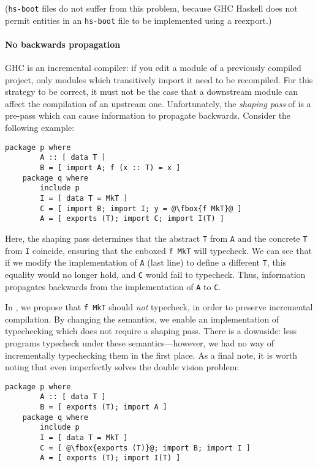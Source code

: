 (\verb|hs-boot| files do not suffer from this problem, because GHC
Haskell does not permit entities in an \verb|hs-boot| file to be implemented
using a reexport.)

\paragraph{No backwards propagation}
GHC is an incremental compiler: if you edit a module of a previously
compiled project, only modules which transitively import it need to be
recompiled.  For this strategy to be correct, it must not be the case
that a downstream module can affect the compilation of an upstream one.
Unfortunately, the \emph{shaping pass} of \OldBackpack{} is a pre-pass
which can cause information to propagate backwards.  Consider the
following example:

\begin{lstlisting}[escapechar=@]
    package p where
        A :: [ data T ]
        B = [ import A; f (x :: T) = x ]
    package q where
        include p
        I = [ data T = MkT ]
        C = [ import B; import I; y = @\fbox{f MkT}@ ]
        A = [ exports (T); import C; import I(T) ]
\end{lstlisting}
%
Here, the shaping pass determines that the abstract \verb|T| from
\verb|A| and the concrete \verb|T| from \verb|I| coincide, ensuring that
the enboxed \verb|f MkT| will typecheck.  We can see that if we
modify the implementation of \verb|A| (last line) to define a different
\verb|T|, this equality would no longer hold, and \verb|C| would
fail to typecheck.  Thus, information propagates backwards from
the implementation of \verb|A| to \verb|C|.

In \Backpack{}, we propose that \verb|f MkT| should \emph{not}
typecheck, in order to preserve incremental compilation.  By changing
the semantics, we enable an implementation of typechecking which
does not require a shaping pass.  There is a downside: less programs
typecheck under these semantics---however, we had no way of incrementally
typechecking them in the first place.  As a final note, it is worth
noting that even \OldBackpack{} imperfectly solves the double vision
problem:

\begin{lstlisting}[escapechar=@]
    package p where
        A :: [ data T ]
        B = [ exports (T); import A ]
    package q where
        include p
        I = [ data T = MkT ]
        C = [ @\fbox{exports (T)}@; import B; import I ]
        A = [ exports (T); import I(T) ]
\end{lstlisting}

